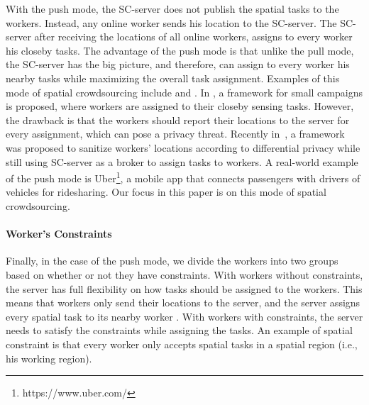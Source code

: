 \documentclass{USC-Thesis}
\numberwithin{equation}{chapter}
\begin{document}
With the push mode, the SC-server does not publish the spatial tasks to the workers. Instead, any online worker sends his location to the SC-server. The SC-server after receiving the locations of all online workers, assigns to every worker his closeby tasks. The advantage of the push mode is that unlike the pull mode, the SC-server has the big picture, and therefore, can assign to every worker his nearby tasks while maximizing the overall task assignment. Examples of this mode of spatial crowdsourcing include \cite{kazemi2012geocrowd} and \cite{kazemi2011privacy}. In \cite{kazemi2011privacy}, a framework for small campaigns is proposed, where workers are assigned to their closeby sensing tasks. However, the drawback is that the workers should report their locations to the server for every assignment, which can pose a privacy threat. Recently in~\cite{to2014framework}, a framework was proposed to sanitize workers' locations according to differential privacy while still using SC-server as a broker to assign tasks to workers. A real-world example of the push mode is Uber\footnote{https://www.uber.com/}, a mobile app that connects passengers with drivers of vehicles for ridesharing. Our focus in this paper is on this mode of spatial crowdsourcing.

\paragraph{Worker's Constraints}
Finally, in the case of the push mode, we divide the workers into two groups based on whether or not they have constraints. With workers without constraints, the server has full flexibility on how tasks should be assigned to the workers. This means that workers only send their locations to the server, and the server assigns every spatial task to its nearby worker \cite{kazemi2011privacy}. With workers with constraints, the server needs to satisfy the constraints while assigning the tasks. An example of spatial constraint is that every worker only accepts spatial tasks in a spatial region (i.e., his working region).
\end{document}
